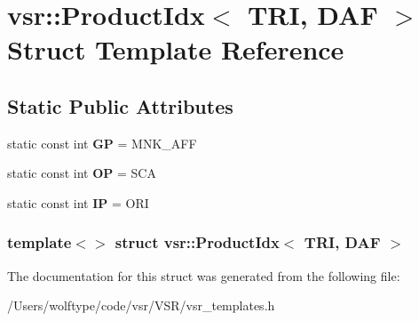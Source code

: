 \hypertarget{structvsr_1_1_product_idx_3_01_t_r_i_00_01_d_a_f_01_4}{\section{vsr\-:\-:Product\-Idx$<$ T\-R\-I, D\-A\-F $>$ Struct Template Reference}
\label{structvsr_1_1_product_idx_3_01_t_r_i_00_01_d_a_f_01_4}
}
\subsection*{Static Public Attributes}
\begin{DoxyCompactItemize}
\item 
\hypertarget{structvsr_1_1_product_idx_3_01_t_r_i_00_01_d_a_f_01_4_ae9c537127b5c270fae2e10480a1679a6}{static const int {\bfseries G\-P} = M\-N\-K\-\_\-\-A\-F\-F}\label{structvsr_1_1_product_idx_3_01_t_r_i_00_01_d_a_f_01_4_ae9c537127b5c270fae2e10480a1679a6}

\item 
\hypertarget{structvsr_1_1_product_idx_3_01_t_r_i_00_01_d_a_f_01_4_a90dd4ef4da711b7a5d5d37b32eb2414e}{static const int {\bfseries O\-P} = S\-C\-A}\label{structvsr_1_1_product_idx_3_01_t_r_i_00_01_d_a_f_01_4_a90dd4ef4da711b7a5d5d37b32eb2414e}

\item 
\hypertarget{structvsr_1_1_product_idx_3_01_t_r_i_00_01_d_a_f_01_4_a6c9cacf4dfedd56e232fa142bc982d8f}{static const int {\bfseries I\-P} = O\-R\-I}\label{structvsr_1_1_product_idx_3_01_t_r_i_00_01_d_a_f_01_4_a6c9cacf4dfedd56e232fa142bc982d8f}

\end{DoxyCompactItemize}
\subsubsection*{template$<$$>$ struct vsr\-::\-Product\-Idx$<$ T\-R\-I, D\-A\-F $>$}



The documentation for this struct was generated from the following file\-:\begin{DoxyCompactItemize}
\item 
/\-Users/wolftype/code/vsr/\-V\-S\-R/vsr\-\_\-templates.\-h\end{DoxyCompactItemize}
